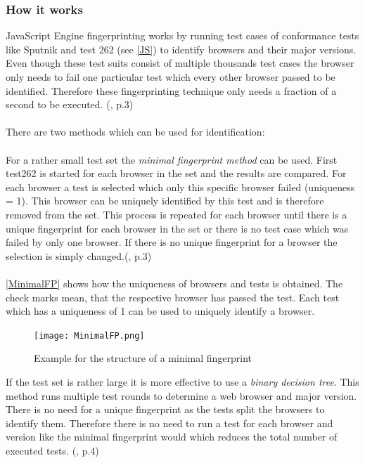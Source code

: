 \subsubsection{How it works}
JavaScript Engine fingerprinting works by running test cases of conformance tests like Sputnik and test 262 (see \autoref{JS}) to identify browsers and their major versions. Even though these test suits consist of multiple thousands test cases the browser only needs to fail one particular test which every other browser passed to be identified. Therefore these fingerprinting technique only needs a fraction of a second to be executed. (\textcite{mulazzani13}, p.3) \\\\
There are two methods which can be used for identification:\\\\
For a rather small test set the \textit{minimal fingerprint method} can be used. First test262 is started for each browser in the set and the results are compared. For each browser a test is selected which only this specific browser failed (uniqueness = 1). This browser can be uniquely identified by this test and is therefore removed from the set. This process is repeated for each browser until there is a unique fingerprint for each browser in the set or there is no test case which was failed by only one browser. If there is no unique fingerprint for a browser the selection is simply changed.(\textcite{mulazzani13}, p.3)\\\\
\autoref{MinimalFP} shows how the uniqueness of browsers and tests is obtained. The check marks mean, that the respective browser has passed the test. Each test which has a uniqueness of 1 can be used to uniquely identify a browser.
\begin{figure}[H]
	\centering
	\texttt{[image: MinimalFP.png]}
	\caption{Example for the structure of a minimal fingerprint\\}
	\label{MinimalFP}
\end{figure}
If the test set is rather large it is more effective to use a \textit{binary decision tree}. This method runs multiple test rounds to determine a web browser and major version. There is no need for a unique fingerprint as the tests split the browsers to identify them. Therefore there is no need to run a test for each browser and version like the  minimal fingerprint would which reduces the total number of executed tests. (\textcite{mulazzani13}, p.4)\\\\
